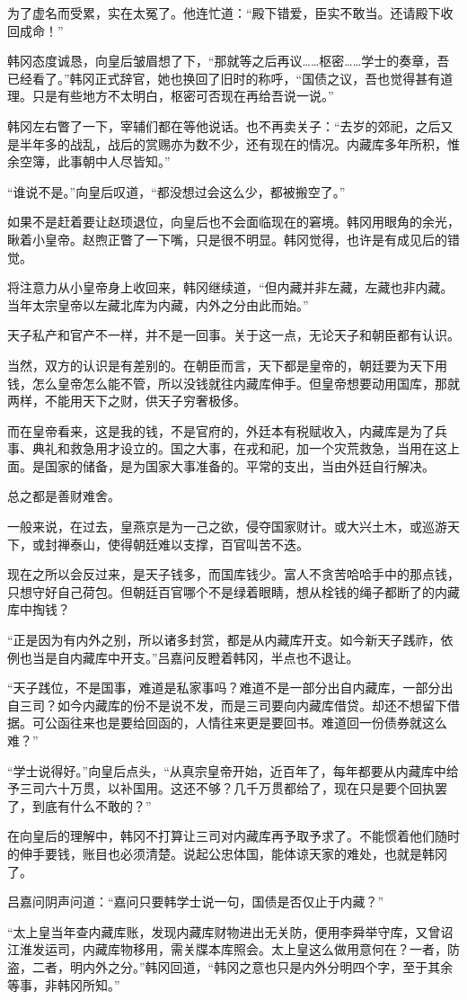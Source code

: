 为了虚名而受累，实在太冤了。他连忙道：“殿下错爱，臣实不敢当。还请殿下收回成命！”

韩冈态度诚恳，向皇后皱眉想了下，“那就等之后再议……枢密……学士的奏章，吾已经看了。”韩冈正式辞官，她也换回了旧时的称呼，“国债之议，吾也觉得甚有道理。只是有些地方不太明白，枢密可否现在再给吾说一说。”

韩冈左右瞥了一下，宰辅们都在等他说话。也不再卖关子：“去岁的郊祀，之后又是半年多的战乱，战后的赏赐亦为数不少，还有现在的情况。内藏库多年所积，惟余空簿，此事朝中人尽皆知。”

“谁说不是。”向皇后叹道，“都没想过会这么少，都被搬空了。”

如果不是赶着要让赵顼退位，向皇后也不会面临现在的窘境。韩冈用眼角的余光，瞅着小皇帝。赵煦正瞥了一下嘴，只是很不明显。韩冈觉得，也许是有成见后的错觉。

将注意力从小皇帝身上收回来，韩冈继续道，“但内藏并非左藏，左藏也非内藏。当年太宗皇帝以左藏北库为内藏，内外之分由此而始。”

天子私产和官产不一样，并不是一回事。关于这一点，无论天子和朝臣都有认识。

当然，双方的认识是有差别的。在朝臣而言，天下都是皇帝的，朝廷要为天下用钱，怎么皇帝怎么能不管，所以没钱就往内藏库伸手。但皇帝想要动用国库，那就两样，不能用天下之财，供天子穷奢极侈。

而在皇帝看来，这是我的钱，不是官府的，外廷本有税赋收入，内藏库是为了兵事、典礼和救急用才设立的。国之大事，在戎和祀，加一个灾荒救急，当用在这上面。是国家的储备，是为国家大事准备的。平常的支出，当由外廷自行解决。

总之都是善财难舍。

一般来说，在过去，皇燕京是为一己之欲，侵夺国家财计。或大兴土木，或巡游天下，或封禅泰山，使得朝廷难以支撑，百官叫苦不迭。

现在之所以会反过来，是天子钱多，而国库钱少。富人不贪苦哈哈手中的那点钱，只想守好自己荷包。但朝廷百官哪个不是绿着眼睛，想从栓钱的绳子都断了的内藏库中掏钱？

“正是因为有内外之别，所以诸多封赏，都是从内藏库开支。如今新天子践祚，依例也当是自内藏库中开支。”吕嘉问反瞪着韩冈，半点也不退让。

“天子践位，不是国事，难道是私家事吗？难道不是一部分出自内藏库，一部分出自三司？如今内藏库的份不是说不发，而是三司要向内藏库借贷。却还不想留下借据。可公函往来也是要给回函的，人情往来更是要回书。难道回一份债券就这么难？”

“学士说得好。”向皇后点头，“从真宗皇帝开始，近百年了，每年都要从内藏库中给予三司六十万贯，以补国用。这还不够？几千万贯都给了，现在只是要个回执罢了，到底有什么不敢的？”

在向皇后的理解中，韩冈不打算让三司对内藏库再予取予求了。不能惯着他们随时的伸手要钱，账目也必须清楚。说起公忠体国，能体谅天家的难处，也就是韩冈了。

吕嘉问阴声问道：“嘉问只要韩学士说一句，国债是否仅止于内藏？”

“太上皇当年查内藏库账，发现内藏库财物进出无关防，便用李舜举守库，又曾诏江淮发运司，内藏库物移用，需关牒本库照会。太上皇这么做用意何在？一者，防盗，二者，明内外之分。”韩冈回道，“韩冈之意也只是内外分明四个字，至于其余等事，非韩冈所知。”

